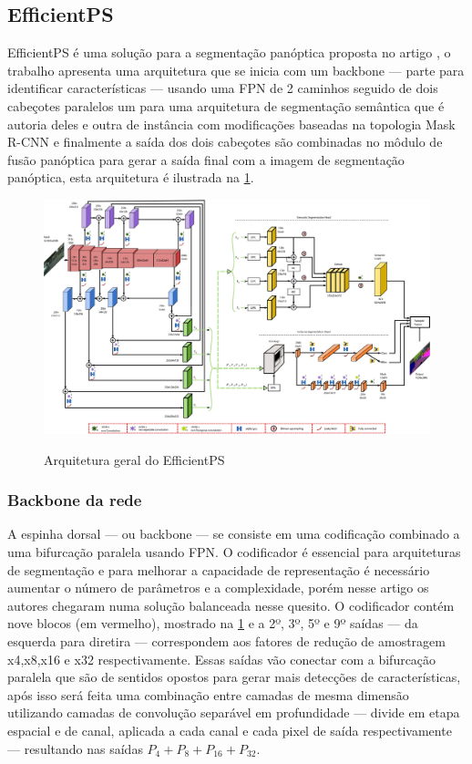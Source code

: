 \subsection{EfficientPS}

EfficientPS é uma solução para a segmentação panóptica proposta no artigo , o trabalho apresenta uma arquitetura que se inicia com um backbone — parte para identificar características — usando uma FPN de 2 caminhos seguido de dois cabeçotes paralelos um para uma arquitetura de segmentação semântica que é autoria deles e outra de instância com modificações baseadas na topologia Mask R-CNN e finalmente a saída dos dois cabeçotes são combinadas no môdulo de fusão panóptica para gerar a saída final com a imagem de segmentação panóptica, esta arquitetura é ilustrada na \cref{fig:arqEP}.

\begin{figure}[H]
	\caption{Arquitetura geral do EfficientPS}
	\centering %
	\includegraphics[width=15cm]{figures/arqEP.jpg} %
	\label{fig:arqEP}
\end{figure}

\subsubsection*{Backbone da rede}

A espinha dorsal — ou backbone — se consiste em uma codificação combinado a uma bifurcação paralela usando FPN. O codificador é essencial para arquiteturas de segmentação e para melhorar a capacidade de representação é necessário aumentar o número de parâmetros e a complexidade, porém nesse artigo os autores chegaram numa solução balanceada nesse quesito. O codificador contém nove blocos (em vermelho), mostrado na \cref{fig:arqEP} e a 2º, 3º, 5º e 9º saídas — da esquerda para diretira — correspondem aos fatores de redução de amostragem x4,x8,x16 e x32 respectivamente. Essas saídas vão conectar com a bifurcação paralela que são de sentidos opostos para gerar mais detecções de características, após isso será feita uma combinação entre camadas de mesma dimensão utilizando camadas de convolução separável em profundidade — divide em etapa espacial e de canal, aplicada a cada canal e cada pixel de saída respectivamente — resultando nas saídas $ P_4 + P_8 + P_{16} + P_{32} $\cite{mohan2020efficientps, redes-neurais-convolucionais-separaveis-em-profundidade}.

